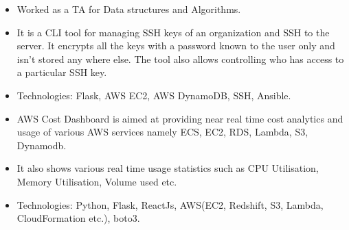 \documentclass[10pt,a4paper]{main}
\begin{document}
\begin{itemize}
  \item Worked as a TA for Data structures and Algorithms.
\end{itemize}

\medskip





\begin{itemize}
    \item It is a CLI tool for managing SSH keys of an organization and SSH to the server. It encrypts all the keys with a password known to the user only and isn't stored any where else. The tool also allows controlling who has access to a particular SSH key.
    \item Technologies: Flask, AWS EC2, AWS DynamoDB, SSH, Ansible.
\end{itemize}

\divider

%



\begin{itemize}
    \item AWS Cost Dashboard is aimed at providing near real time cost analytics and usage of various AWS services namely ECS, EC2, RDS, Lambda, S3, Dynamodb.
    \item It also shows various real time usage statistics such as CPU Utilisation, Memory Utilisation, Volume used etc.
    \item Technologies: Python, Flask, ReactJs, AWS(EC2, Redshift, S3, Lambda, CloudFormation etc.), boto3.
\end{itemize}

%
\end{document}
